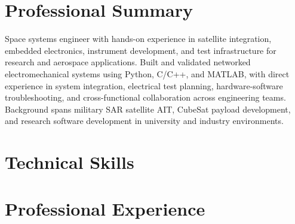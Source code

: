 \documentclass[letterpaper,11pt]{moderncv}
\begin{document}
\makecvtitle
\vspace{-3em}

\section{Professional Summary}
Space systems engineer with hands-on experience in satellite integration, embedded electronics, instrument development, and test infrastructure for research and aerospace applications. Built and validated networked electromechanical systems using Python, C/C++, and MATLAB, with direct experience in system integration, electrical test planning, hardware-software troubleshooting, and cross-functional collaboration across engineering teams. Background spans military SAR satellite AIT, CubeSat payload development, and research software development in university and industry environments.

\section{Technical Skills}
\begin{minipage}[t]{0.48\textwidth}
\end{minipage}%
\hfill
\begin{minipage}[t]{0.48\textwidth}
\end{minipage}

\section{Professional Experience}
\end{document}
